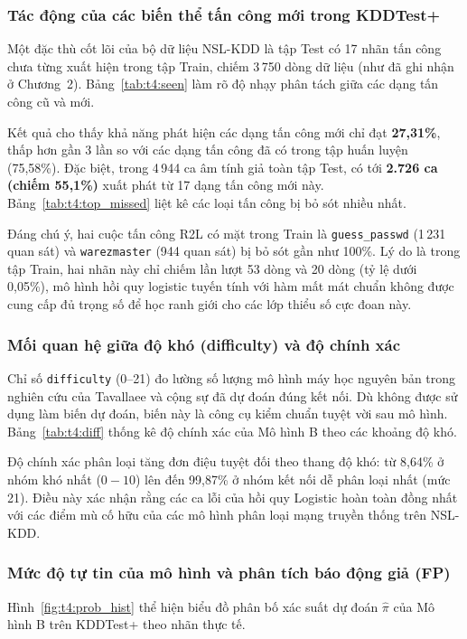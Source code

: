 \documentclass[../main.tex]{subfiles}
\begin{document}
\subsubsection{Tác động của các biến thể tấn công mới trong KDDTest+}
Một đặc thù cốt lõi của bộ dữ liệu NSL-KDD là tập Test có 17 nhãn tấn công chưa từng xuất hiện trong tập Train, chiếm 3\,750 dòng dữ liệu (như đã ghi nhận ở Chương~2). Bảng~\ref{tab:t4:seen} làm rõ độ nhạy phân tách giữa các dạng tấn công cũ và mới.

Kết quả cho thấy khả năng phát hiện các dạng tấn công mới chỉ đạt \textbf{27,31\%}, thấp hơn gần 3 lần so với các dạng tấn công đã có trong tập huấn luyện (75,58\%). Đặc biệt, trong 4\,944 ca âm tính giả toàn tập Test, có tới \textbf{2.726 ca (chiếm 55,1\%)} xuất phát từ 17 dạng tấn công mới này. Bảng~\ref{tab:t4:top_missed} liệt kê các loại tấn công bị bỏ sót nhiều nhất.

Đáng chú ý, hai cuộc tấn công R2L có mặt trong Train là \texttt{guess\_passwd} (1\,231 quan sát) và \texttt{warezmaster} (944 quan sát) bị bỏ sót gần như 100\%. Lý do là trong tập Train, hai nhãn này chỉ chiếm lần lượt 53 dòng và 20 dòng (tỷ lệ dưới 0,05\%), mô hình hồi quy logistic tuyến tính với hàm mất mát chuẩn không được cung cấp đủ trọng số để học ranh giới cho các lớp thiểu số cực đoan này.

\subsubsection{Mối quan hệ giữa độ khó (difficulty) và độ chính xác}
Chỉ số \texttt{difficulty} (0--21) đo lường số lượng mô hình máy học nguyên bản trong nghiên cứu của Tavallaee và cộng sự \cite{task1_tavallaee2009} đã dự đoán đúng kết nối. Dù không được sử dụng làm biến dự đoán, biến này là công cụ kiểm chuẩn tuyệt vời sau mô hình. Bảng~\ref{tab:t4:diff} thống kê độ chính xác của Mô hình B theo các khoảng độ khó.

Độ chính xác phân loại tăng đơn điệu tuyệt đối theo thang độ khó: từ 8,64\% ở nhóm khó nhất ($0-10$) lên đến 99,87\% ở nhóm kết nối dễ phân loại nhất (mức 21). Điều này xác nhận rằng các ca lỗi của hồi quy Logistic hoàn toàn đồng nhất với các điểm mù cố hữu của các mô hình phân loại mạng truyền thống trên NSL-KDD.

\subsubsection{Mức độ tự tin của mô hình và phân tích báo động giả (FP)}
Hình~\ref{fig:t4:prob_hist} thể hiện biểu đồ phân bố xác suất dự đoán $\hat\pi$ của Mô hình B trên KDDTest+ theo nhãn thực tế.
\end{document}
